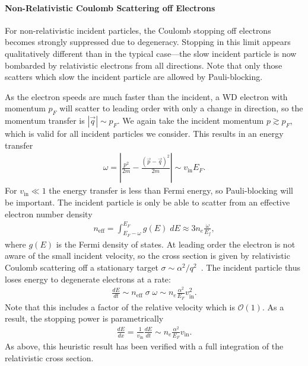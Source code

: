 \documentclass[preprintnumbers,amsmath,amssymb,prd,superscriptaddress]{revtex4}
\newcommand{\OO}{\mathcal{O}}
\newcommand{\x}[1]{\ensuremath{\text{#1}}} %
\begin{document}
\begin{appendices}
\paragraph{Non-Relativistic Coulomb Scattering off Electrons}
For non-relativistic incident particles, the Coulomb stopping off electrons becomes strongly suppressed due to degeneracy.
Stopping in this limit appears qualitatively different than in the typical case---the slow incident particle is now bombarded by relativistic electrons from all directions.
Note that only those scatters which slow the incident particle are allowed by Pauli-blocking.

As the electron speeds are much faster than the incident, a WD electron with momentum $p_F$ will scatter to leading order with only a change in direction, so the momentum transfer is $|\vec{q}| \sim p_F$.
We again take the incident momentum $p \gtrsim p_F$, which is valid for all incident particles we consider. This results in an energy transfer
\begin{align}
\label{eq:NonRelEnergyTransfer}
  \omega = \left|\frac{p^2}{2 m} -
    \frac{\left(\vec{p} - \vec{q}\right)^2}{2 m}\right|
    \sim v_\x{in} E_F.
\end{align}
For $v_\x{in} \ll 1$ the energy transfer is less than Fermi energy, so Pauli-blocking will be important.
The incident particle is only be able to scatter from an effective electron number density
\begin{align}
  \label{eq:neff}
    n_\x{eff} = \int_{E_F - \omega}^{E_F} g(E) \; dE
    \approx 3 n_e \frac{\omega}{E_f},
\end{align}
where $g(E)$ is the Fermi density of states.
At leading order the electron is not aware of the small incident velocity, so the cross section is given by relativistic Coulomb scattering off a stationary target $\sigma \sim \alpha^2/q^2$~\cite{Jackson}.
The incident particle thus loses energy to degenerate electrons at a rate:
\begin{align}
  \frac{dE}{dt} \sim n_\x{eff} \; \sigma \; \omega
  \sim n_e \frac{\alpha^2}{E_F} v_\x{in}^2.
\end{align}
Note that this includes a factor of the relative velocity which is $\OO(1)$.
As a result, the stopping power is parametrically
\begin{align}
  \label{eq:degnonrel}
  \frac{dE}{dx} =  \frac{1}{v_\x{in}} \frac{dE}{dt} \sim
  n_e \frac{\alpha^2}{E_F} v_\x{in}.
\end{align}
As above, this heuristic result has been verified with a full integration of the relativistic cross section.


\end{appendices}
\end{document}
